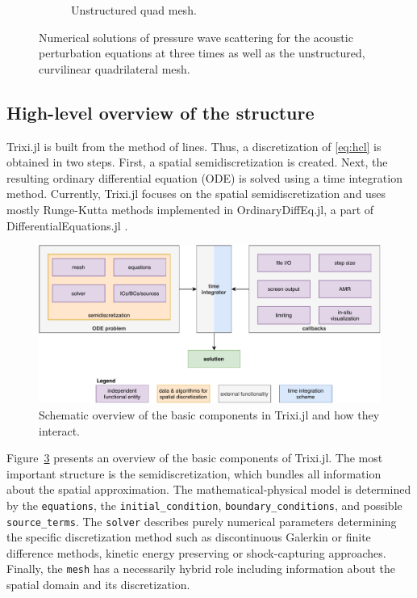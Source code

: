 \documentclass{juliacon}
\newcommand{\trixi}{Trixi.jl\xspace}
\begin{document}
\begin{figure}[!h]
\begin{subfigure}{0.475\linewidth}
    \caption{Unstructured quad mesh.}
    \label{fig:ginger_mesh}
  \end{subfigure}%
  \caption{Numerical solutions of pressure wave scattering for the acoustic
                perturbation equations at three times as well as the unstructured,
                curvilinear quadrilateral mesh.}
  \label{fig:pressure_waves}
\end{figure}


\subsection{High-level overview of the structure}

\trixi is built from the method of lines. Thus, a discretization of \eqref{eq:hcl}
is obtained in two steps. First, a spatial semidiscretization is created. Next,
the resulting ordinary differential equation (ODE) is solved using a time
integration method. Currently, \trixi focuses on the spatial semidiscretization
and uses mostly Runge-Kutta methods implemented in OrdinaryDiffEq.jl, a part
of DifferentialEquations.jl \cite{rackauckas2017differentialequations}.

\begin{figure}[htbp]
  \includegraphics[width=\linewidth]{../figures/trixi_global_overview}
  \caption{Schematic overview of the basic components in \trixi and how they
           interact.}
  \label{fig:trixi_global_overview}
\end{figure}

Figure~\ref{fig:trixi_global_overview} presents an overview of the basic
components of \trixi. The most important structure is the semidiscretization,
which bundles all information about the spatial approximation. The mathematical-physical
model is determined by the \lstinline{equations}, the \lstinline{initial_condition},
\lstinline{boundary_conditions}, and possible \lstinline{source_terms}. The
\lstinline{solver} describes purely numerical parameters determining the specific
discretization method such as discontinuous Galerkin or finite difference
methods, kinetic energy preserving or shock-capturing approaches. Finally, the
\lstinline{mesh} has a necessarily hybrid role including information about the
spatial domain and its discretization.
\end{document}
